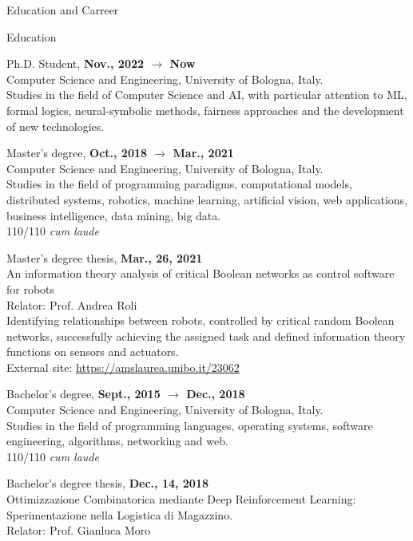 \documentclass{resume} %
\begin{document}
\begin{rSection}{Education and Carreer}
\begin{rSubsection}{Education}{}{}{}
            \item Ph.D. Student, \textbf{Nov., 2022 $\rightarrow$ Now}
            \\Computer Science and Engineering, University of Bologna, Italy.
            \\Studies in the field of Computer Science and AI, with particular attention to ML, formal logics, neural-symbolic methods, fairness approaches and the development of new technologies.
            \item Master's degree, \textbf{Oct., 2018 $\rightarrow$ Mar., 2021}
            \\Computer Science and Engineering, University of Bologna, Italy.
            \\Studies in the field of programming paradigms, computational models, distributed systems, robotics, machine learning, artificial vision, web applications, business intelligence, data mining, big data.
            \\110/110 \emph{cum laude}
            \item Master's degree thesis, \textbf{Mar., 26, 2021}
            \\An information theory analysis of critical Boolean networks as control software for robots
            \\Relator: Prof. Andrea Roli
            \\Identifying relationships between robots, controlled by critical random Boolean networks, successfully achieving the assigned task and defined information theory functions on sensors and actuators.
            \\External site: \url{https://amslaurea.unibo.it/23062}
            \item Bachelor's degree, \textbf{Sept., 2015 $\rightarrow$ Dec., 2018}
            \\Computer Science and Engineering, University of Bologna, Italy.
            \\Studies in the field of programming languages, operating systems, software engineering, algorithms, networking and web.
            \\110/110 \emph{cum laude}
            \item Bachelor's degree thesis, \textbf{Dec., 14, 2018}
            \\Ottimizzazione Combinatorica mediante Deep Reinforcement Learning: Sperimentazione nella Logistica di Magazzino.
            \\Relator: Prof. Gianluca Moro

\end{rSubsection}
\end{rSection}
\end{document}
